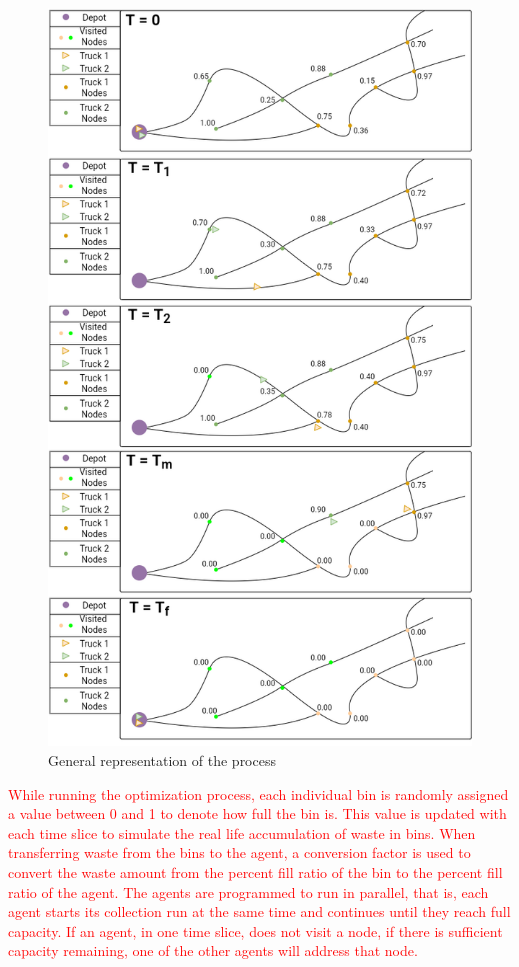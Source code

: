 \documentclass[12pt]{article}
\begin{document}
\begin{figure}[H]
    \centering
    \includegraphics[scale=0.6]{ExplainationFigure.png}
    \caption{General representation of the process}\label{fige}
\end{figure}
\textcolor{red}{While running the optimization process, each individual bin is randomly assigned a value between 0 and 1 to denote how full the bin is. This value is updated with each time slice to simulate the real life accumulation of waste in bins. When transferring waste from the bins to the agent, a conversion factor is used to convert the waste amount from the percent fill ratio of the bin to the percent fill ratio of the agent. The agents are programmed to run in parallel, that is, each agent starts its collection run at the same time and continues until they reach full capacity. If an agent, in one time slice, does not visit a node, if there is sufficient capacity remaining, one of the other agents will address that node.}
\end{document}
